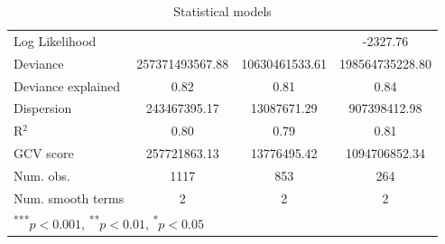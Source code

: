 \documentclass[12pt]{article}
\begin{document}
\begin{table}
\begin{center}
\begin{tabular}{l c c c }
Log Likelihood                       &                 &                & -2327.76        \\
Deviance                             & 257371493567.88 & 10630461533.61 & 198564735228.80 \\
Deviance explained                   & 0.82            & 0.81           & 0.84            \\
Dispersion                           & 243467395.17    & 13087671.29    & 907398412.98    \\
R$^2$                                & 0.80            & 0.79           & 0.81            \\
GCV score                            & 257721863.13    & 13776495.42    & 1094706852.34   \\
Num. obs.                            & 1117            & 853            & 264             \\
Num. smooth terms                    & 2               & 2              & 2               \\
\hline
\multicolumn{4}{l}{\scriptsize{\textsuperscript{***}$p<0.001$, 
  \textsuperscript{**}$p<0.01$, 
  \textsuperscript{*}$p<0.05$}}
\end{tabular}
\caption{Statistical models}
\label{table:investment}
\end{center}
\end{table}
\end{document}
